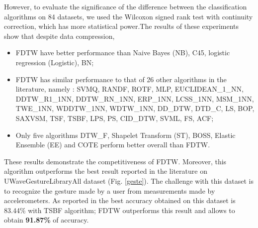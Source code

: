 However, to evaluate the significance of the difference between the classification algorithms on 84 datasets, we used the Wilcoxon signed rank test with continuity correction, which has more statistical power.The results of these experiments  show that despite data compression, 
\begin{itemize}
  \item  FDTW have better performance than Naive Bayes (NB), C45,  logistic regression (Logistic), BN;
  \item FDTW has similar performance to that of 26 other algorithms in the literature, namely : SVMQ, RANDF, ROTF, MLP, EUCLIDEAN\_1\_NN, DDTW\_R1\_1NN, DDTW\_RN\_1NN, ERP\_1NN, LCSS\_1NN, MSM\_1NN, TWE\_1NN, WDDTW\_1NN, WDTW\_1NN, DD\_DTW, DTD\_C, LS, BOP, SAXVSM, TSF, TSBF, LPS, PS, CID\_DTW, SVML, FS, ACF;
  \item Only five algorithms DTW\_F, Shapelet Transform (ST), BOSS, Elastic Ensemble (EE) and COTE perform better overall than FDTW.
\end{itemize}

These results demonstrate the competitiveness of FDTW. Moreover, this algorithm
outperforms the best result reported in the literature on  UWaveGestureLibraryAll dataset (Fig.
\ref{geste}).
The challenge with this dataset is to recognize the gesture made by a user
from measurements made by accelerometers. As reported in \cite{Bagnall} the best accuracy obtained
on this dataset is 83.44\% with TSBF algorithm; FDTW outperforms this result and allows to obtain \textbf{91.87\%} of accuracy.



